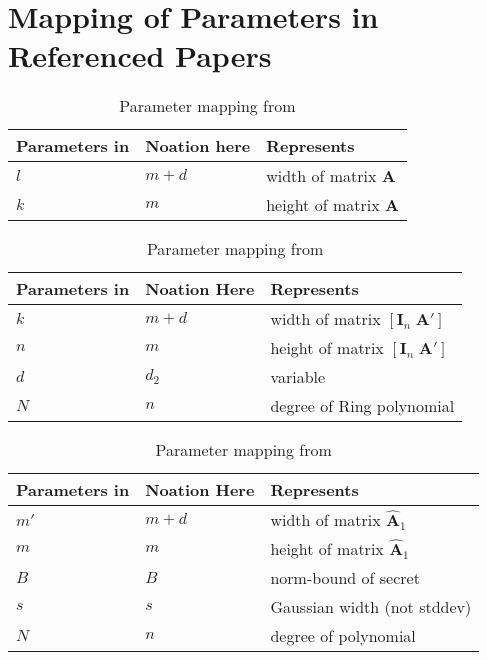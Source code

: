 \section{Mapping of Parameters in Referenced Papers}
\begin{table}
    \centering
    \begin{tabular}[h]{lll}
        \toprule
        Parameters in \cite{LPR13} & Noation here & Represents                    \\\hline
        $l$                        & $m+d$        & width of matrix $\mathbf{A}$  \\
        $k$                        & $m$          & height of matrix $\mathbf{A}$ \\
        \bottomrule
    \end{tabular}
    \caption{Parameter mapping from \cite{LPR13}}\label{tab:mapping-LPR13}
    \vspace{1cm}
    \centering
    \begin{tabular}[h]{lll}
        \toprule
        Parameters in \cite{BDLOP18} & Noation Here & Represents                                         \\\hline
        $k$                          & $m+d$        & width of matrix $[ \mathbf{I}_n \; \mathbf{A}' ]$  \\
        $n$                          & $m$          & height of matrix $[ \mathbf{I}_n \; \mathbf{A}' ]$ \\
        $d$                          & $d_2$        & variable                                           \\
        $N$                          & $n$          & degree of Ring polynomial                          \\
        \bottomrule
    \end{tabular}
    \caption{Parameter mapping from \cite{BDLOP18}}\label{tab:mapping-BDLOP18}
    \vspace{1cm}
    \centering
    \begin{tabular}[h]{lll}
        \toprule
        Parameters in \cite{DOTT21} & Noation Here & Represents                            \\\hline
        $m'$                        & $m+d$        & width of matrix $\hat{\mathbf{A}}_1$  \\
        $m$                         & $m$          & height of matrix $\hat{\mathbf{A}}_1$ \\
        $B$                         & $B$          & norm-bound of secret                  \\
        $s$                         & $s$          & Gaussian width (not stddev)           \\
        $N$                         & $n$          & degree of polynomial                  \\
        \bottomrule
    \end{tabular}
    \caption{Parameter mapping from \cite{DOTT21}}\label{tab:mapping-DOTT21}
\end{table}
